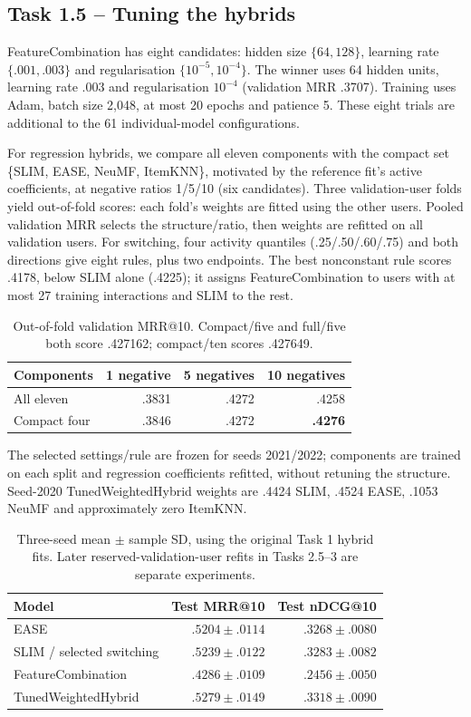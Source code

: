 \documentclass[12pt,a4paper]{article}   %
\begin{document}
\clearpage
\subsection{Task 1.5 -- Tuning the hybrids}

FeatureCombination has eight candidates: hidden size $\{64,128\}$, learning rate $\{.001,.003\}$ and regularisation $\{10^{-5},10^{-4}\}$. The winner uses 64 hidden units, learning rate .003 and regularisation $10^{-4}$ (validation MRR .3707). Training uses Adam, batch size 2,048, at most 20 epochs and patience 5. These eight trials are additional to the 61 individual-model configurations.

For regression hybrids, we compare all eleven components with the compact set \{SLIM, EASE, NeuMF, ItemKNN\}, motivated by the reference fit's active coefficients, at negative ratios 1/5/10 (six candidates). Three validation-user folds yield out-of-fold scores: each fold's weights are fitted using the other users. Pooled validation MRR selects the structure/ratio, then weights are refitted on all validation users. For switching, four activity quantiles (.25/.50/.60/.75) and both directions give eight rules, plus two endpoints. The best nonconstant rule scores .4178, below SLIM alone (.4225); it assigns FeatureCombination to users with at most 27 training interactions and SLIM to the rest.

\begin{table}[H]
\centering
\begin{tabular}{lrrr}
\toprule
Components & 1 negative & 5 negatives & 10 negatives \\
\midrule
All eleven & .3831 & .4272 & .4258 \\
Compact four & .3846 & .4272 & \textbf{.4276} \\
\bottomrule
\end{tabular}
\caption{Out-of-fold validation MRR@10. Compact/five and full/five both score .427162; compact/ten scores .427649.}
\label{tab:tuning}
\end{table}

The selected settings/rule are frozen for seeds 2021/2022; components are trained on each split and regression coefficients refitted, without retuning the structure. Seed-2020 TunedWeightedHybrid weights are .4424 SLIM, .4524 EASE, .1053 NeuMF and approximately zero ItemKNN.

\begin{table}[H]
\centering
\begin{tabular}{lrr}
\toprule
Model & Test MRR@10 & Test nDCG@10 \\
\midrule
EASE & $.5204\pm.0114$ & $.3268\pm.0080$ \\
SLIM / selected switching & $.5239\pm.0122$ & $.3283\pm.0082$ \\
FeatureCombination & $.4286\pm.0109$ & $.2456\pm.0050$ \\
TunedWeightedHybrid & $.5279\pm.0149$ & $.3318\pm.0090$ \\
\bottomrule
\end{tabular}
\caption{Three-seed mean $\pm$ sample SD, using the original Task 1 hybrid fits. Later reserved-validation-user refits in Tasks 2.5--3 are separate experiments.}
\end{table}
\end{document}
